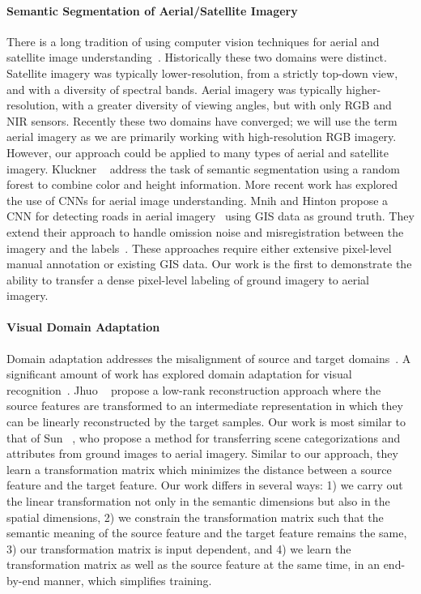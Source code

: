 \paragraph{Semantic Segmentation of Aerial/Satellite Imagery}

There is a long tradition of using computer vision techniques for
aerial and satellite image
understanding~\cite{Huertas1988DetectingBI,Willuhn1996ARS,Cheng2016ASO}.
Historically these two domains were distinct.  Satellite imagery was
typically lower-resolution, from a strictly top-down view, and with a
diversity of spectral bands.  Aerial imagery was typically
higher-resolution, with a greater diversity of viewing angles, but
with only RGB and NIR sensors.  Recently these two domains have
converged; we will use the term aerial imagery as we are primarily
working with high-resolution RGB imagery.  However, our approach could
be applied to many types of aerial and satellite imagery.  Kluckner 
\etal~\cite{Kluckner2009SemanticCI} address the task of semantic
segmentation using a random forest to combine color and height
information.  More recent work has explored the use of CNNs for aerial
image understanding. Mnih and Hinton propose a CNN for detecting roads
in aerial imagery~\cite{mnih2010learning} using GIS data as ground
truth.  They extend their approach to handle omission noise and
misregistration between the imagery and the
labels~\cite{mnih2012learning}. These approaches require either
extensive pixel-level manual annotation or existing GIS data. Our work
is the first to demonstrate the ability to transfer a dense
pixel-level labeling of ground imagery to aerial imagery.

\paragraph{Visual Domain Adaptation}
Domain adaptation addresses the misalignment of source and target
domains~\cite{daume2006domain}. A significant amount of work has
explored domain adaptation for visual
recognition~\cite{patel2015visual}. Jhuo \etal~\cite{jhuo2012robust}
propose a low-rank reconstruction approach where the source features
are transformed to an intermediate representation in which they can be
linearly reconstructed by the target samples. Our work is most similar
to that of Sun \etal ~\cite{sun2016unsupervised}, who propose a method
for transferring scene categorizations and attributes from ground
images to aerial imagery. Similar to our approach, they learn a
transformation matrix which minimizes the distance between a source
feature and the target feature. Our work differs in several ways: 1)
we carry out the linear transformation not only in the semantic
dimensions but also in the spatial dimensions, 2) we constrain the
transformation matrix such that the semantic meaning of the source
feature and the target feature remains the same, 3) our transformation
matrix is input dependent, and 4) we learn the transformation matrix
as well as the source feature at the same time, in an end-by-end
manner, which simplifies training. 

